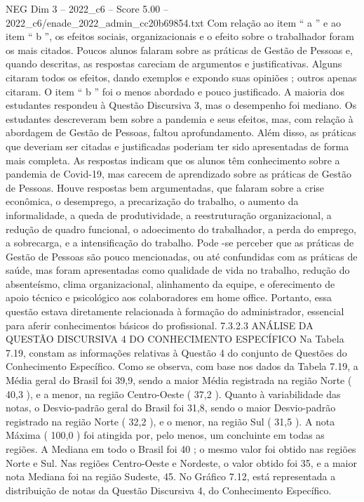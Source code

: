 \begin{textsample}{NEG Dim 3 – 2022\_c6 – Score 5.00 – 2022\_c6/enade\_2022\_admin\_cc20b69854.txt}
Com relação ao item “ a ” e ao item “ b ”, os efeitos sociais, organizacionais e o efeito sobre o trabalhador foram os mais citados.
Poucos alunos falaram sobre as práticas de Gestão de Pessoas e, quando descritas, as respostas careciam de argumentos e justificativas.
Alguns citaram todos os efeitos, dando exemplos e expondo suas opiniões ; outros apenas citaram.
O item “ b ” foi o menos abordado e pouco justificado.
A maioria dos estudantes respondeu à Questão Discursiva 3, mas o desempenho foi mediano.
Os estudantes descreveram bem sobre a pandemia e seus efeitos, mas, com relação à abordagem de Gestão de Pessoas, faltou aprofundamento.
Além disso, as práticas que deveriam ser citadas e justificadas poderiam ter sido apresentadas de forma mais completa.
As respostas indicam que os alunos têm conhecimento sobre a pandemia de Covid-19, mas carecem de aprendizado sobre as práticas de Gestão de Pessoas.
Houve respostas bem argumentadas, que falaram sobre a crise econômica, o desemprego, a precarização do trabalho, o aumento da informalidade, a queda de produtividade, a reestruturação organizacional, a redução de quadro funcional, o adoecimento do trabalhador, a perda do emprego, a sobrecarga, e a intensificação do trabalho.
Pode -se perceber que as práticas de Gestão de Pessoas são pouco mencionadas, ou até confundidas com as práticas de saúde, mas foram apresentadas como qualidade de vida no trabalho, redução do absenteísmo, clima organizacional, alinhamento da equipe, e oferecimento de apoio técnico e psicológico aos colaboradores em home office.
Portanto, essa questão estava diretamente relacionada à formação do administrador, essencial para aferir conhecimentos básicos do profissional. 7.3.2.3 ANÁLISE DA QUESTÃO DISCURSIVA 4 DO CONHECIMENTO ESPECÍFICO Na Tabela 7.19, constam as informações relativas à Questão 4 do conjunto de Questões do Conhecimento Específico.
Como se observa, com base nos dados da Tabela 7.19, a Média geral do Brasil foi 39,9, sendo a maior Média registrada na região Norte ( 40,3 ), e a menor, na região Centro-Oeste ( 37,2 ).
Quanto à variabilidade das notas, o Desvio-padrão geral do Brasil foi 31,8, sendo o maior Desvio-padrão registrado na região Norte ( 32,2 ), e o menor, na região Sul ( 31,5 ).
A nota Máxima ( 100,0 ) foi atingida por, pelo menos, um concluinte em todas as regiões.
A Mediana em todo o Brasil foi 40 ; o mesmo valor foi obtido nas regiões Norte e Sul.
Nas regiões Centro-Oeste e Nordeste, o valor obtido foi 35, e a maior nota Mediana foi na região Sudeste, 45.
No Gráfico 7.12, está representada a distribuição de notas da Questão Discursiva 4, do Conhecimento Específico.

\end{textsample}
